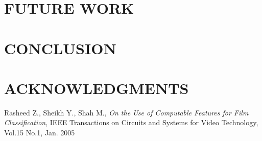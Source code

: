 \documentclass[letterpaper, 10 pt, conference]{ieeeconf}  %
\begin{document}
\section{FUTURE WORK}



\section{CONCLUSION}



\section{ACKNOWLEDGMENTS}




\begin{thebibliography}{99}
Rasheed Z., Sheikh Y., Shah M., {\it On the Use of Computable Features for Film Classification}, IEEE Transactions on Circuits and Systems for Video Technology, Vol.15 No.1, Jan. 2005
\end{thebibliography}
\end{document}

